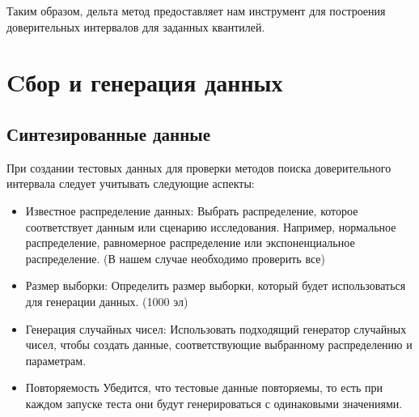 \documentclass[specialist,
               substylefile = spbu_report.rtx,
               subf,href,colorlinks=true, 12pt]{disser}
\begin{document}
Таким образом, дельта метод предоставляет нам инструмент для построения доверительных интервалов для заданных квантилей.

\newpage
\section{Cбор и генерация данных}

\subsection{Синтезированные данные}
    При создании тестовых данных для проверки методов поиска доверительного интервала следует учитывать следующие аспекты:
    \begin{itemize}
        \item    Известное распределение данных: 
        Выбрать распределение, которое соответствует данным или сценарию исследования. Например, нормальное распределение, равномерное распределение или экспоненциальное распределение.
        (В нашем случае необходимо проверить все)
        \item 	 Размер выборки: 
        Определить размер выборки, который будет использоваться для генерации данных. (1000 эл)
        \item 	 Генерация случайных чисел:
        Использовать подходящий генератор случайных чисел, чтобы создать данные, соответствующие выбранному распределению и параметрам. 
        \item 	 Повторяемость
        Убедится, что тестовые данные повторяемы, то есть при каждом запуске теста они будут генерироваться с одинаковыми значениями.
    \end{itemize}  
     
\end{document}
